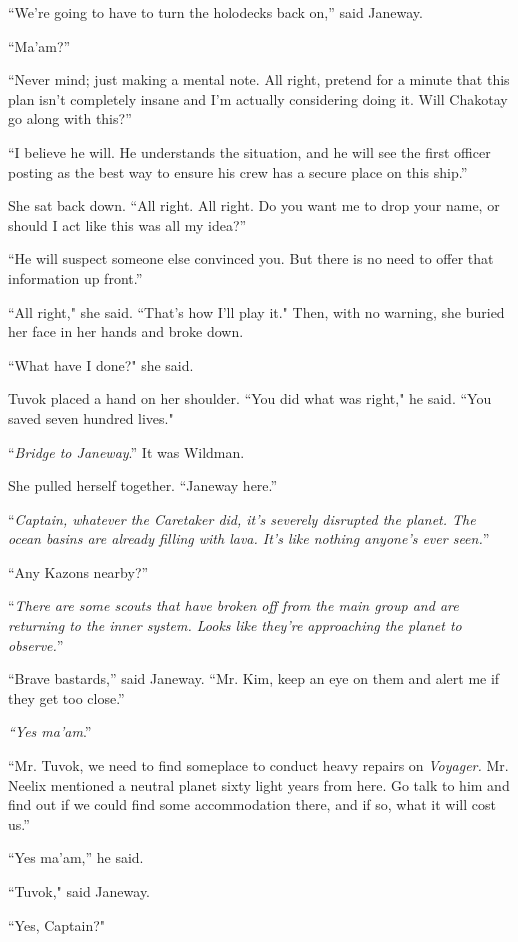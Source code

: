 \documentclass[twoside,letterpaper,12pt]{memoir}
\begin{document}
``We’re going to have to turn the holodecks back on,” said Janeway. 

``Ma’am?” 

``Never mind; just making a mental note. All right, pretend for a minute that this plan isn’t completely insane and I’m actually considering doing it. Will Chakotay go along with this?” 

``I believe he will. He understands the situation, and he will see the first officer posting as the best way to ensure his crew has a secure place on this ship.” 

She sat back down. ``All right. All right. Do you want me to drop your name, or should I act like this was all my idea?” 

``He will suspect someone else convinced you. But there is no need to offer that information up front.”

``All right," she said. ``That's how I'll play it." Then, with no warning, she buried her face in her hands and broke down.

``What have I done?" she said.

Tuvok placed a hand on her shoulder. ``You did what was right," he said. ``You saved seven hundred lives."

``\textit{Bridge to Janeway}.” It was Wildman. 

She pulled herself together. ``Janeway here.” 

``\textit{Captain, whatever the Caretaker did, it’s severely disrupted the planet. The ocean basins are already filling with lava. It’s like nothing anyone’s ever seen.}” 

``Any Kazons nearby?” 

``\textit{There are some scouts that have broken off from the main group and are returning to the inner system. Looks like they’re approaching the planet to observe.}” 

``Brave bastards,” said Janeway. ``Mr. Kim, keep an eye on them and alert me if they get too close.” 

\textit{``Yes ma’am}.” 

``Mr. Tuvok, we need to find someplace to conduct heavy repairs on \textit{Voyager. }Mr. Neelix mentioned a neutral planet sixty light years from here. Go talk to him and find out if we could find some accommodation there, and if so, what it will cost us.” 

``Yes ma’am,” he said. 

``Tuvok," said Janeway.

``Yes, Captain?"
\end{document}
